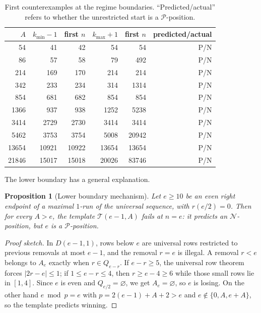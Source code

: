 \documentclass[11pt]{article}
\newtheorem{proposition}[theorem]{Proposition}
\theoremstyle{remark}
\newcommand{\Pset}{\mathcal{P}}
\newcommand{\Nset}{\mathcal{N}}
\begin{document}
\begin{table}[h]
\centering
\small
\caption{First counterexamples at the regime boundaries. ``Predicted/actual'' refers to whether the unrestricted start is a \(\Pset\)-position.}
\label{tab:boundaries}
\begin{tabular}{rrrrrr}
\toprule
\(A\) & \(k_{\min}-1\) & first \(n\) & \(k_{\max}+1\) & first \(n\) & predicted/actual\\
\midrule
54 & 41 & 42 & 54 & 54 & P/N\\
86 & 57 & 58 & 79 & 492 & P/N\\
214 & 169 & 170 & 214 & 214 & P/N\\
342 & 233 & 234 & 314 & 1314 & P/N\\
854 & 681 & 682 & 854 & 854 & P/N\\
1366 & 937 & 938 & 1252 & 5238 & P/N\\
3414 & 2729 & 2730 & 3414 & 3414 & P/N\\
5462 & 3753 & 3754 & 5008 & 20942 & P/N\\
13654 & 10921 & 10922 & 13654 & 13654 & P/N\\
21846 & 15017 & 15018 & 20026 & 83746 & P/N\\
\bottomrule
\end{tabular}
\end{table}

The lower boundary has a general explanation.

\begin{proposition}[Lower boundary mechanism]\label{prop:lower}
Let \(e\ge10\) be an even right endpoint of a maximal \(1\)-run of the universal sequence, with \(r(e/2)=0\). Then for every \(A>e\), the template \(\mathcal T(e-1,A)\) fails at \(n=e\): it predicts an \(\Nset\)-position, but \(e\) is a \(\Pset\)-position.
\end{proposition}

\begin{proof}[Proof sketch]
In \(D(e-1,1)\), rows below \(e\) are universal rows restricted to previous removals at most \(e-1\), and the removal \(r=e\) is illegal. A removal \(r<e\) belongs to \(A_e\) exactly when \(r\in Q_{e-r}\). If \(e-r\ge5\), the universal row theorem forces \(|2r-e|\le1\); if \(1\le e-r\le4\), then \(r\ge e-4\ge6\) while those small rows lie in \([1,4]\). Since \(e\) is even and \(Q_{e/2}=\varnothing\), we get \(A_e=\varnothing\), so \(e\) is losing. On the other hand \(e\bmod p=e\) with \(p=2(e-1)+A+2>e\) and \(e\notin\{0,A,e+A\}\), so the template predicts winning.
\end{proof}
\end{document}
